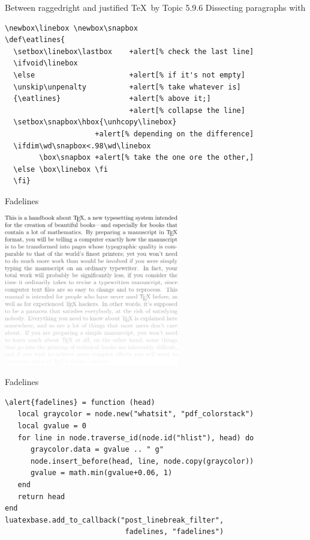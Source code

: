 \documentclass[t,10pt]{beamer}
\begin{document}
\begin{frame}[fragile]{Between raggedright and justified}
  \alert{\TeX\ by Topic} 5.9.6 Dissecting paragraphs with
  \texttt{\string\lastbox}
  \begin{Verbatim}[fontsize=\small,commandchars=+\[\]]
\newbox\linebox \newbox\snapbox
\def\eatlines{
  \setbox\linebox\lastbox    +alert[% check the last line]
  \ifvoid\linebox
  \else                      +alert[% if it's not empty]
  \unskip\unpenalty          +alert[% take whatever is]
  {\eatlines}                +alert[% above it;]
                             +alert[% collapse the line]
  \setbox\snapbox\hbox{\unhcopy\linebox}
                     +alert[% depending on the difference]
  \ifdim\wd\snapbox<.98\wd\linebox
        \box\snapbox +alert[% take the one ore the other,]
  \else \box\linebox \fi
  \fi}
  \end{Verbatim}
\end{frame}

\begin{frame}{Fadelines}
  \begin{center}
    \includegraphics[width=3in]{fade.pdf}
  \end{center}
\end{frame}

\begin{frame}[fragile]{Fadelines}
  \begin{Verbatim}[fontsize=\small,commandchars=\\\{\}]
\alert{fadelines} = function (head)
   local graycolor = node.new("whatsit", "pdf_colorstack")
   local gvalue = 0
   for line in node.traverse_id(node.id("hlist"), head) do
      graycolor.data = gvalue .. " g"
      node.insert_before(head, line, node.copy(graycolor))
      gvalue = math.min(gvalue+0.06, 1)
   end
   return head
end
luatexbase.add_to_callback("post_linebreak_filter",
                            fadelines, "fadelines")
  \end{Verbatim}
\end{frame}
\end{document}
